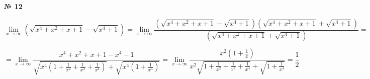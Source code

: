\documentclass{article}
\begin{document}
\textbf{№ 12} 

$$ \lim\limits_{x \to \infty} \left( \sqrt{x^4+x^2+x+1} - \sqrt{x^4+1} \right)
= \lim\limits_{x \to \infty} \frac{\left( \sqrt{x^4+x^2+x+1} - \sqrt{x^4+1} \right) \left( \sqrt{x^4+x^2+x+1} + \sqrt{x^4+1} \right)}{\left( \sqrt{x^4+x^2+x+1} + \sqrt{x^4+1} \right)}
= $$

$$ = \lim\limits_{x \to \infty} \frac{x^4+x^2+x+1-x^4-1}{\sqrt{x^4(1+\frac{1}{x^2}+\frac{1}{x^3}+\frac{1}{x^4})} + \sqrt{x^4(1+\frac{1}{x^4})}} 
= \lim\limits_{x \to \infty} \frac{x^2(1+\frac{1}{x})}{x^2\sqrt{1+\frac{1}{x^2}+\frac{1}{x^3}+\frac{1}{x^4}} + \sqrt{1+\frac{1}{x^4}}} 
= \frac{1}{2} $$
\end{document}
